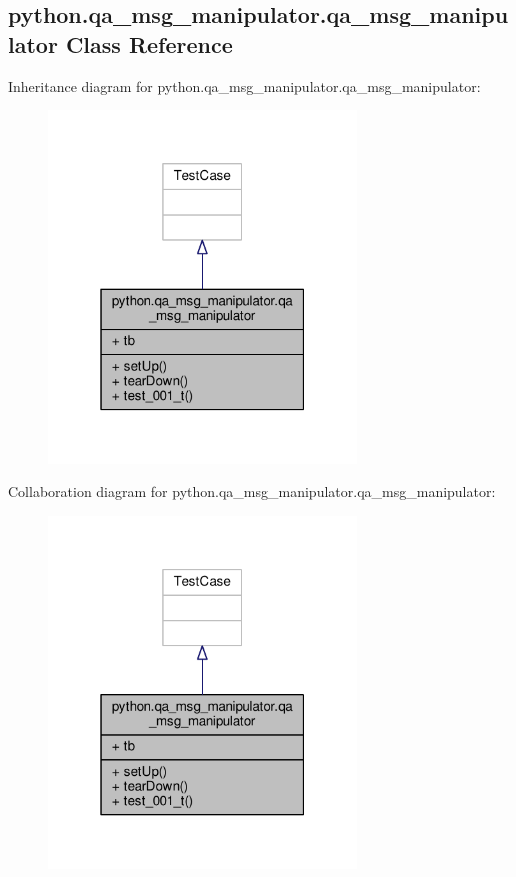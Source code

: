 \subsection{python.\+qa\+\_\+msg\+\_\+manipulator.\+qa\+\_\+msg\+\_\+manipulator Class Reference}
\label{classpython_1_1qa__msg__manipulator_1_1qa__msg__manipulator}


Inheritance diagram for python.\+qa\+\_\+msg\+\_\+manipulator.\+qa\+\_\+msg\+\_\+manipulator\+:
\nopagebreak
\begin{figure}[H]
\begin{center}
\leavevmode
\includegraphics[width=232pt]{d0/d2f/classpython_1_1qa__msg__manipulator_1_1qa__msg__manipulator__inherit__graph}
\end{center}
\end{figure}


Collaboration diagram for python.\+qa\+\_\+msg\+\_\+manipulator.\+qa\+\_\+msg\+\_\+manipulator\+:
\nopagebreak
\begin{figure}[H]
\begin{center}
\leavevmode
\includegraphics[width=232pt]{d8/dba/classpython_1_1qa__msg__manipulator_1_1qa__msg__manipulator__coll__graph}
\end{center}
\end{figure}
